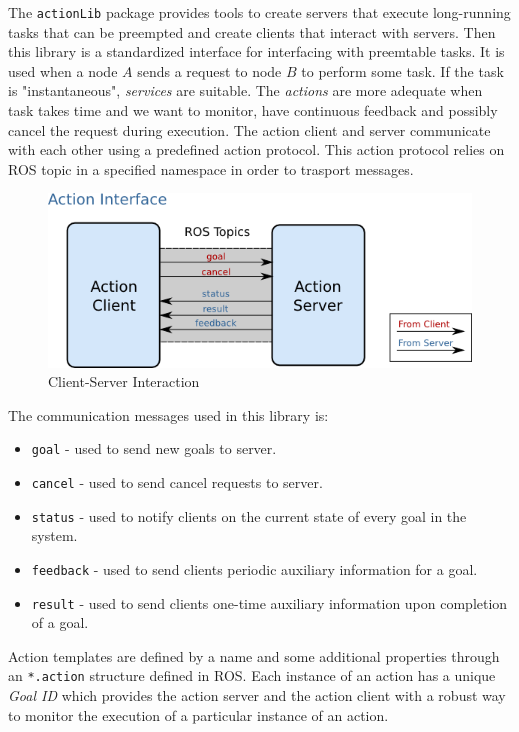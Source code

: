 The \texttt{actionLib} package provides tools to create servers that execute long-running
tasks that can be preempted and create clients that interact with servers.
Then this library is a standardized interface for interfacing with preemtable tasks.
It is used when a node $A$ sends a request to node $B$ to perform some task. If the task is 
"instantaneous", \textit{services} are suitable. The \textit{actions} are more adequate when 
task takes time and we want to monitor, have continuous feedback and possibly cancel the 
request during execution.
The action client and server communicate with each other using a predefined action 
protocol. This action protocol relies on ROS topic in a specified namespace in order to trasport 
messages.

\begin{figure} [hbt]
    \centering
    \includegraphics[width=\textwidth]{img/action_interface.png}
    \caption{Client-Server Interaction}
    \label{fig:action_interface}
\end{figure}

The communication messages used in this library is: 
\begin{itemize}
    \item \texttt{goal} - used to send new goals to server.
    \item \texttt{cancel} - used to send cancel requests to server.
    \item \texttt{status} - used to notify clients on the current state of every goal in the system.
    \item \texttt{feedback} - used to send clients periodic auxiliary information for a goal.
    \item \texttt{result} - used to send clients one-time auxiliary information upon completion of a goal.
\end{itemize} 

Action templates are defined by a name and some additional properties through an 
\texttt{*.action} structure defined in ROS. Each instance of an action has a unique 
\textit{Goal ID} which provides the action server and the action client with a robust 
way to monitor the execution of a particular instance of an action.

